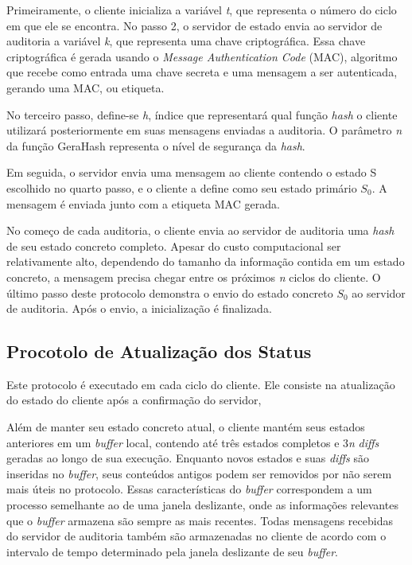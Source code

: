 Primeiramente, o cliente inicializa a variável \textit{t}, que representa o número do ciclo em que ele se encontra. No passo 2, o servidor de estado envia ao servidor de auditoria a variável \textit{k}, que representa uma chave criptográfica. Essa chave criptográfica é gerada usando o \textit{Message Authentication Code} (MAC), algoritmo que recebe como entrada uma chave secreta e uma mensagem a ser autenticada, gerando uma MAC, ou etiqueta.\cite{mac}

No terceiro passo, define-se \textit{h}, índice que representará qual função \textit{hash} o cliente utilizará posteriormente em suas mensagens enviadas a auditoria. O parâmetro \textit{n} da função GeraHash representa o nível de segurança da \textit{hash}. 

Em seguida, o servidor envia uma mensagem ao cliente contendo o estado S escolhido no quarto passo, e o cliente a define como seu estado primário $S_0$. A mensagem é enviada junto com a etiqueta MAC gerada.

No começo de cada auditoria, o cliente envia ao servidor de auditoria uma \textit{hash} de seu estado concreto completo. Apesar do custo computacional ser relativamente alto, dependendo do tamanho da informação contida em um estado concreto, a mensagem precisa chegar entre os próximos \textit{n} ciclos do cliente. O último passo deste protocolo demonstra o envio do estado concreto $S_0$ ao servidor de auditoria. Após o envio, a inicialização é finalizada.


\subsection{Procotolo de Atualização dos Status}

Este protocolo é executado em cada ciclo do cliente. Ele consiste na atualização do estado do cliente após a confirmação do servidor,

Além de manter seu estado concreto atual, o cliente mantém seus estados anteriores em um \textit{buffer} local, contendo até três estados completos e 3\textit{n} \textit{diffs} geradas ao longo de sua execução. Enquanto novos estados e suas \textit{diffs} são inseridas no \textit{buffer}, seus conteúdos antigos podem ser removidos por não serem mais úteis no protocolo. Essas características do \textit{buffer} correspondem a um processo semelhante ao de uma janela deslizante, onde as informações relevantes que o \textit{buffer} armazena são sempre as mais recentes. Todas mensagens recebidas do servidor de auditoria também são armazenadas no cliente de acordo com o intervalo de tempo determinado pela janela deslizante de seu \textit{buffer}.

